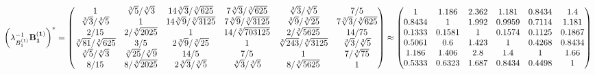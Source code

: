\documentclass[10pt,a4paper]{article}
\begin{document}
	\[
		\left(\lambda_{B_1^{(1)}}^{-1}\bold{B_1^{(1)}}\right)^* = 
		\begin{pmatrix}
			{1}{} & {\sqrt[3]{5}} / {\sqrt[3]{3}} & {{14}\sqrt[3]{3}} / {\sqrt[3]{625}} & {{7}\sqrt[3]{3}} / {\sqrt[3]{625}} & {\sqrt[3]{3}} / {\sqrt[3]{5}} & {{7}} / {{5}} \\
			{\sqrt[3]{3}} / {\sqrt[3]{5}} & {1}{} & {{14}\sqrt[3]{9}} / {\sqrt[3]{3125}} & {{7}\sqrt[3]{9}} / {\sqrt[3]{3125}} & {\sqrt[3]{9}} / {\sqrt[3]{25}} & {{7}\sqrt[3]{3}} / {\sqrt[3]{625}} \\
			{{2}} / {{15}} & {{2}} / {\sqrt[3]{2025}} & {1}{} & {{14}} / {\sqrt[3]{703125}} & {{2}} / {\sqrt[3]{5625}} & {{14}} / {{75}} \\
			{\sqrt[3]{81}} / {\sqrt[3]{625}} & {{3}} / {{5}} & {{2}\sqrt[3]{9}} / {\sqrt[3]{25}} & {1}{} & {\sqrt[3]{243}} / {\sqrt[3]{3125}} & {\sqrt[3]{3}} / {\sqrt[3]{5}} \\
			{\sqrt[3]{5}} / {\sqrt[3]{3}} & {\sqrt[3]{25}} / {\sqrt[3]{9}} & {{14}} / {{5}} & {{7}} / {{5}} & {1}{} & {{7}} / {\sqrt[3]{75}} \\
			{{8}} / {{15}} & {{8}} / {\sqrt[3]{2025}} & {{2}\sqrt[3]{3}} / {\sqrt[3]{5}} & {\sqrt[3]{3}} / {\sqrt[3]{5}} & {{8}} / {\sqrt[3]{5625}} & {1}{} \\
		\end{pmatrix}
		\approx
		\begin{pmatrix}
			1        & 1.186    & 2.362    & 1.181    & 0.8434   & 1.4      \\
			0.8434   & 1        & 1.992    & 0.9959   & 0.7114   & 1.181    \\
			0.1333   & 0.1581   & 1        & 0.1574   & 0.1125   & 0.1867   \\
			0.5061   & 0.6      & 1.423    & 1        & 0.4268   & 0.8434   \\
			1.186    & 1.406    & 2.8      & 1.4      & 1        & 1.66     \\
			0.5333   & 0.6323   & 1.687    & 0.8434   & 0.4498   & 1        \\
		\end{pmatrix}
	\]
\end{document}
